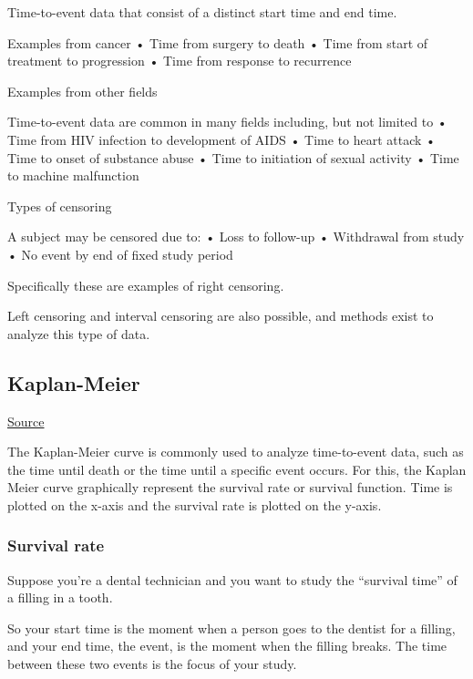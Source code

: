 \documentclass[
]{book}
\begin{document}
Time-to-event data that consist of a distinct start time and end time.

Examples from cancer
• Time from surgery to death
• Time from start of treatment to progression
• Time from response to recurrence

Examples from other fields

Time-to-event data are common in many fields including, but not limited to
• Time from HIV infection to development of AIDS
• Time to heart attack
• Time to onset of substance abuse
• Time to initiation of sexual activity
• Time to machine malfunction

Types of censoring

A subject may be censored due to:
• Loss to follow-up
• Withdrawal from study
• No event by end of fixed study period

Specifically these are examples of right censoring.

Left censoring and interval censoring are also possible, and methods exist to analyze this type of data.

\hypertarget{kaplan-meier}{%
\subsection{Kaplan-Meier}\label{kaplan-meier}}

\href{https://datatab.net/tutorial/kaplan-meier-curve\#:~:text=The\%20Kaplan-Meier\%20curve\%20shows,therefore\%20a\%20better\%20survival\%20prognosis.}{Source}

The Kaplan-Meier curve is commonly used to analyze time-to-event data, such as the time until death or the time until a specific event occurs. For this, the Kaplan Meier curve graphically represent the survival rate or survival function. Time is plotted on the x-axis and the survival rate is plotted on the y-axis.

\hypertarget{survival-rate}{%
\subsubsection{Survival rate}\label{survival-rate}}

Suppose you're a dental technician and you want to study the ``survival time'' of a filling in a tooth.

So your start time is the moment when a person goes to the dentist for a filling, and your end time, the event, is the moment when the filling breaks. The time between these two events is the focus of your study.
\end{document}
